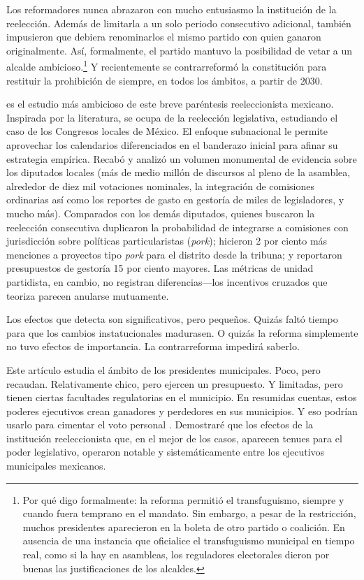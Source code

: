 \documentclass[letter,12pt]{article}
\begin{document}
Los reformadores nunca abrazaron con mucho entusiasmo la institución de la reelección. Además de limitarla a un solo periodo consecutivo adicional, también impusieron que debiera renominarlos el mismo partido con quien ganaron originalmente. Así, formalmente, el partido mantuvo la posibilidad de vetar a un alcalde ambicioso.\footnote{Por qué digo formalmente: la reforma permitió el transfuguismo, siempre y cuando fuera temprano en el mandato. Sin embargo, a pesar de la restricción, muchos presidentes aparecieron en la boleta de otro partido o coalición. En ausencia de una instancia que oficialice el transfuguismo municipal en tiempo real, como si la hay en asambleas, los reguladores electorales dieron por buenas las justificaciones de los alcaldes.} Y recientemente se contrarreformó la constitución para restituir la prohibición de siempre, en todos los ámbitos, a partir de 2030.

\citet{motolinia-reel-book2026} es el estudio más ambicioso de este breve paréntesis reeleccionista mexicano. Inspirada por la literatura, se ocupa de la reelección legislativa, estudiando el caso de los Congresos locales de México. El enfoque subnacional le permite aprovechar los calendarios diferenciados en el banderazo inicial para afinar su estrategia empírica. Recabó y analizó un volumen monumental de evidencia sobre los diputados locales (más de medio millón de discursos al pleno de la asamblea, alrededor de diez mil votaciones nominales, la integración de comisiones ordinarias así como los reportes de gasto en gestoría de miles de legisladores, y mucho más). Comparados con los demás diputados, quienes buscaron la reelección consecutiva duplicaron la probabilidad de integrarse a comisiones con jurisdicción sobre políticas particularistas (\emph{pork}); hicieron 2 por ciento más menciones a proyectos tipo \emph{pork} para el distrito desde la tribuna; y reportaron presupuestos de gestoría 15 por ciento mayores. Las métricas de unidad partidista, en cambio, no registran diferencias---los incentivos cruzados que teoriza parecen anularse mutuamente. 

Los efectos que detecta son significativos, pero pequeños. Quizás faltó tiempo para que los cambios instatucionales madurasen. O quizás la reforma simplemente no tuvo efectos de importancia. La contrarreforma impedirá saberlo.

Este artículo estudia el ámbito de los presidentes municipales. Poco, pero recaudan. Relativamente chico, pero ejercen un presupuesto. Y limitadas, pero tienen ciertas facultades regulatorias en el municipio. En resumidas cuentas, estos poderes ejecutivos crean ganadores y perdedores en sus municipios. Y eso podrían usarlo para cimentar el voto personal \citep{cain.etal.1987,carey.shugart.1995}. Demostraré que los efectos de la institución reeleccionista que, en el mejor de los casos, aparecen tenues para el poder legislativo, operaron notable y sistemáticamente entre los ejecutivos municipales mexicanos. 
\end{document}
